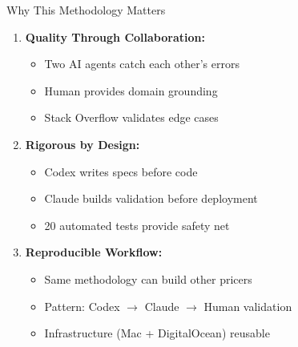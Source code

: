 \documentclass[aspectratio=169,11pt]{beamer}
\begin{document}
\begin{frame}{Why This Methodology Matters}
\begin{enumerate}
    \item \textbf{Quality Through Collaboration:}
    \begin{itemize}
        \item Two AI agents catch each other's errors
        \item Human provides domain grounding
        \item Stack Overflow validates edge cases
    \end{itemize}

    \item \textbf{Rigorous by Design:}
    \begin{itemize}
        \item Codex writes specs before code
        \item Claude builds validation before deployment
        \item 20 automated tests provide safety net
    \end{itemize}

    \item \textbf{Reproducible Workflow:}
    \begin{itemize}
        \item Same methodology can build other pricers
        \item Pattern: Codex $\to$ Claude $\to$ Human validation
        \item Infrastructure (Mac + DigitalOcean) reusable
    \end{itemize}
\end{enumerate}

\end{frame}
\end{document}
